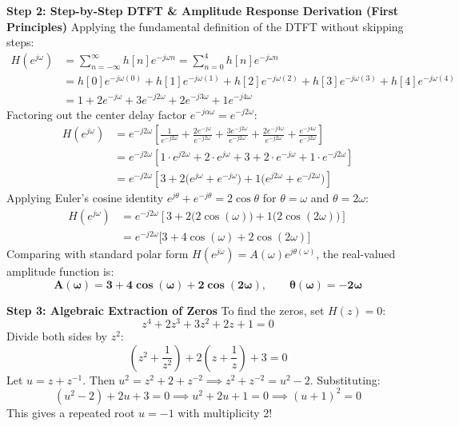 \documentclass[11pt,a4paper]{article}
\begin{document}
\vspace{1mm}
\noindent\textbf{Step 2: Step-by-Step DTFT \& Amplitude Response Derivation (First Principles)}
Applying the fundamental definition of the DTFT without skipping steps:
\begin{align}
H(e^{j\omega}) &= \sum_{n=-\infty}^{\infty} h[n] e^{-j\omega n} = \sum_{n=0}^{4} h[n] e^{-j\omega n} \nonumber \\
&= h[0] e^{-j\omega(0)} + h[1] e^{-j\omega(1)} + h[2] e^{-j\omega(2)} + h[3] e^{-j\omega(3)} + h[4] e^{-j\omega(4)} \nonumber \\
&= 1 + 2e^{-j\omega} + 3e^{-j2\omega} + 2e^{-j3\omega} + 1e^{-j4\omega}
\end{align}
Factoring out the center delay factor $e^{-j\alpha\omega} = e^{-j 2\omega}$:
\begin{align}
H(e^{j\omega}) &= e^{-j2\omega} \left[ \frac{1}{e^{-j2\omega}} + \frac{2e^{-j\omega}}{e^{-j2\omega}} + \frac{3e^{-j2\omega}}{e^{-j2\omega}} + \frac{2e^{-j3\omega}}{e^{-j2\omega}} + \frac{e^{-j4\omega}}{e^{-j2\omega}} \right] \nonumber \\
&= e^{-j2\omega} \left[ 1\cdot e^{j2\omega} + 2\cdot e^{j\omega} + 3 + 2\cdot e^{-j\omega} + 1\cdot e^{-j2\omega} \right] \nonumber \\
&= e^{-j2\omega} \left[ 3 + 2\big(e^{j\omega} + e^{-j\omega}\big) + 1\big(e^{j2\omega} + e^{-j2\omega}\big) \right]
\end{align}
Applying Euler's cosine identity $e^{j\theta} + e^{-j\theta} = 2\cos\theta$ for $\theta = \omega$ and $\theta = 2\omega$:
\begin{align}
H(e^{j\omega}) &= e^{-j2\omega} \left[ 3 + 2\big(2\cos(\omega)\big) + 1\big(2\cos(2\omega)\big) \right] \nonumber \\
&= e^{-j2\omega} \big[ 3 + 4\cos(\omega) + 2\cos(2\omega) \big]
\end{align}
Comparing with standard polar form $H(e^{j\omega}) = A(\omega) e^{j\theta(\omega)}$, the real-valued amplitude function is:
\begin{equation}
\mathbf{A(\omega) = 3 + 4\cos(\omega) + 2\cos(2\omega)}, \qquad \mathbf{\theta(\omega) = -2\omega}
\end{equation}

\vspace{1mm}
\noindent\textbf{Step 3: Algebraic Extraction of Zeros}
To find the zeros, set $H(z) = 0$:
\begin{equation}
z^4 + 2z^3 + 3z^2 + 2z + 1 = 0
\end{equation}
Divide both sides by $z^2$:
\begin{equation}
\left(z^2 + \frac{1}{z^2}\right) + 2\left(z + \frac{1}{z}\right) + 3 = 0
\end{equation}
Let $u = z + z^{-1}$. Then $u^2 = z^2 + 2 + z^{-2} \implies z^2 + z^{-2} = u^2 - 2$. Substituting:
\begin{equation}
(u^2 - 2) + 2u + 3 = 0 \implies u^2 + 2u + 1 = 0 \implies (u + 1)^2 = 0
\end{equation}
This gives a repeated root $u = -1$ with multiplicity 2!
\end{document}
